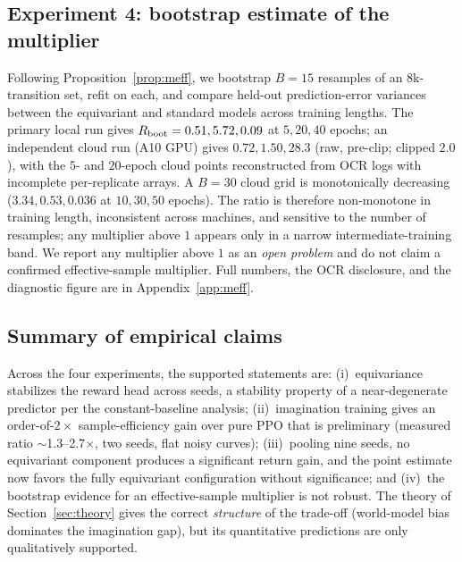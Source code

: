 \documentclass[sigconf,anonymous]{acmart}
\begin{document}
\subsection{Experiment 4: bootstrap estimate of the multiplier}
Following Proposition~\ref{prop:meff}, we bootstrap $B=15$ resamples of an
$8$k-transition set, refit on each, and compare held-out prediction-error
variances between the equivariant and standard models across training
lengths. The primary local run gives $R_{\rm boot}=0.51, 5.72, 0.09$ at
$5,20,40$ epochs; an independent cloud run (A10 GPU) gives $0.72, 1.50,
28.3$ (raw, pre-clip; clipped $2.0$), with the $5$- and $20$-epoch cloud
points reconstructed from OCR logs with incomplete per-replicate arrays. A
$B=30$ cloud grid is monotonically decreasing ($3.34, 0.53, 0.036$ at
$10,30,50$ epochs). The ratio is therefore non-monotone in training length,
inconsistent across machines, and sensitive to the number of resamples; any
multiplier above $1$ appears only in a narrow intermediate-training band. We
report any multiplier above $1$ as an \emph{open problem} and do not claim a
confirmed effective-sample multiplier. Full numbers, the OCR disclosure, and
the diagnostic figure are in Appendix~\ref{app:meff}.

\subsection{Summary of empirical claims}
Across the four experiments, the supported statements are:
(i)~equivariance stabilizes the reward head across seeds, a stability
property of a near-degenerate predictor per the constant-baseline analysis;
(ii)~imagination training gives an order-of-$2\times$ sample-efficiency
gain over pure PPO that is preliminary (measured ratio $\sim$1.3--2.7$\times$,
two seeds, flat noisy curves); (iii)~pooling nine seeds, no equivariant
component produces a significant return gain, and the point estimate now
favors the fully equivariant configuration without significance; and
(iv)~the bootstrap evidence for an effective-sample multiplier is not robust.
The theory of Section~\ref{sec:theory} gives the correct \emph{structure} of
the trade-off (world-model bias dominates the imagination gap), but its
quantitative predictions are only qualitatively supported.

\end{document}

